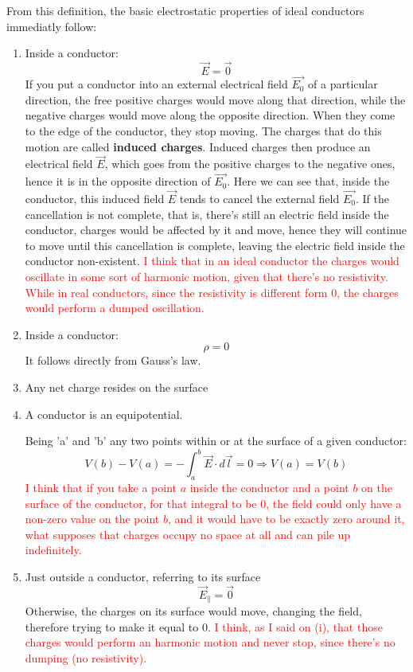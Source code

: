 \documentclass[oneside, 12pt, notitlepage]{book}
\begin{document}
From this definition, the basic electrostatic properties of ideal conductors immediatly follow:
\renewcommand{\labelenumi}{(\roman{enumi})}
\begin{enumerate}
    \item Inside a conductor:$$\vec{E} = \vec{0}$$
    If you put a conductor into an external electrical field $\vec{E_ 0}$ of a particular direction, the free positive charges would move along that direction, while the negative charges would move along the opposite direction. When they come to the edge of the conductor, they stop moving. The charges that do this motion are called \textbf{induced charges}. Induced charges then produce an electrical field $\vec{E}$, which goes from the positive charges to the negative ones, hence it is in the opposite direction of $\vec{E_0}$. Here we can see that, inside the conductor, this induced field $\vec{E}$ tends to cancel the external field $\vec{E_0}$. If the cancellation is not complete, that is, there's still an electric field inside the conductor, charges would be affected by it and move, hence they will continue to move until this cancellation is complete, leaving the electric field inside the conductor non-existent. \textcolor{red}{I think that in an ideal conductor the charges would oscillate in some sort of harmonic motion, given that there's no resistivity. While in real conductors, since the resistivity is different form $0$, the charges would perform a dumped oscillation.}
    \item  Inside a conductor: $$\rho = 0$$ It follows directly from Gauss's law.
    \item Any net charge resides on the surface
    \item A conductor is an equipotential. \par
    Being 'a' and 'b' any two points within or at the surface of a given conductor:
    $$V(b) - V(a) = - \int_a^b \vec{E} \cdot d\vec{l} = 0 \Rightarrow V(a) = V(b)$$
    \textcolor{red}{I think that if you take a point $a$ inside the conductor and a point $b$ on the surface of the conductor, for that integral to be $0$, the field could only have a non-zero value on the point $b$, and it would have to be exactly zero around it, what supposes that charges occupy no space at all and can pile up indefinitely.}
    \item Just outside a conductor, referring to its surface $$\vec{E}_\parallel = \vec{0}$$
    Otherwise, the charges on its surface would move, changing the field, therefore trying to make it equal to $0$. \textcolor{red}{I think, as I said on (i), that those charges would perform an harmonic motion and never stop, since there's no dumping (no resistivity).}

\end{enumerate}
\end{document}
